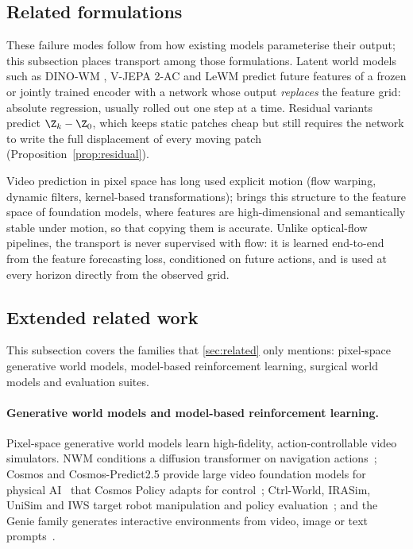 \subsection{Related formulations}\label{app:related-formulations}
These failure modes follow from how existing models parameterise their output; this subsection places transport among
those formulations.
Latent world models such as DINO-WM \citep{zhou2025dinowm}, V-JEPA 2-AC \citep{assran2025vjepa2} and LeWM
\citep{maes2026lewm} predict future features of a frozen or jointly trained encoder with a network whose output
\emph{replaces} the feature grid: absolute regression, usually rolled out one step at a time. Residual variants predict
$\Z_k-\Z_0$, which keeps static patches cheap but still requires the network to write the full displacement of
every moving patch (Proposition~\ref{prop:residual}).

Video prediction in pixel space has long used explicit motion
(flow warping, dynamic filters, kernel-based transformations); \ours{} brings this structure to the feature space of
foundation models, where features are high-dimensional and semantically stable under motion, so that copying them is
accurate. Unlike optical-flow pipelines, the transport is never supervised with flow: it is learned end-to-end from the
feature forecasting loss, conditioned on future actions, and is used at every horizon directly from the observed grid.

\FloatBarrier
\subsection{Extended related work}\label{app:related-extended}
This subsection covers the families that \cref{sec:related} only mentions: pixel-space generative world models,
model-based reinforcement learning, surgical world models and evaluation suites.
\paragraph{Generative world models and model-based reinforcement learning.}
Pixel-space generative world models learn high-fidelity, action-controllable video simulators. NWM conditions a diffusion
transformer on navigation actions~\citep{bar2025nwm}; Cosmos and Cosmos-Predict2.5 provide large video foundation models
for physical AI~\citep{nvidia2025cosmos,nvidia2025cosmospredict25} that Cosmos Policy adapts for control~\citep{kim2026cosmospolicy};
Ctrl-World, IRASim, UniSim and IWS target robot manipulation and policy evaluation~\citep{guo2026ctrlworld,zhu2025irasim,yang2024unisim,wang2026iws};
and the Genie family generates interactive environments from video, image or text prompts~\citep{bruce2024genie,parkerholder2025genie3}.

